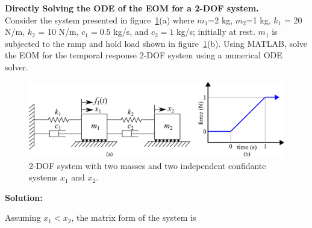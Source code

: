 \documentclass[12pt,letter]{article}
\begin{document}
			

	
	\begin{example}
	\textbf{Directly Solving the ODE of the EOM for a 2-DOF system.} \\

	Consider the system presented in figure~\ref{fig:2-DOF-spring_mass_dashpot_horizontal_forced_ramp_function}(a) where $m_1$=2 kg, $m_2$=1 kg, $k_1$ = 20 N/m, $k_2$ = 10 N/m, $c_1=0.5$ kg/s, and $c_2=1$ kg/s; initially at rest. $m_1$ is subjected to the ramp and hold load shown in figure~\ref{fig:2-DOF-spring_mass_dashpot_horizontal_forced_ramp_function}(b). 	Using MATLAB, solve the EOM for the temporal response 2-DOF system using a numerical ODE solver.

			\begin{figure}[H]
				\centering
				\includegraphics[width=\linewidth]{../figures/2-DOF-spring_mass_dashpot_horizontal_forced_ramp_function}
				\caption{2-DOF system with two masses and two independent confidante systems $x_1$ and $x_2$.}
				\label{fig:2-DOF-spring_mass_dashpot_horizontal_forced_ramp_function}
			\end{figure}
			
			
\noindent \textbf{Solution:} 
	
	Assuming $x_1<x_2$, the matrix form of the system is
	

\end{example}
\end{document}
